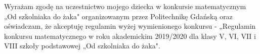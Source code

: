 \documentclass[10pt]{article}
\begin{document}
Wyrażam zgodę na uczestnictwo mojego dziecka w konkursie matematycznym „Od szkolniaka do żaka" organizowanym przez Politechnikę Gdańską oraz oświadczam, że akceptuję regulamin wyżej wymienionego konkursu - „Regulamin konkursu matematycznego w roku akademickim 2019/2020 dla klasy V, VI, VII i VIII szkoły podstawowej „Od szkolniaka do żaka".
\end{document}
